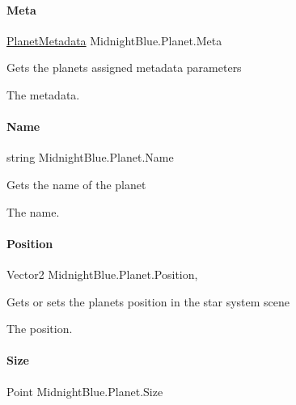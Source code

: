 \paragraph{\texorpdfstring{Meta}{Meta}}
{\footnotesize\ttfamily \hyperlink{class_midnight_blue_1_1_planet_metadata}{Planet\+Metadata} Midnight\+Blue.\+Planet.\+Meta\hspace{0.3cm}{\ttfamily [get]}}



Gets the planets assigned metadata parameters 

The metadata.\hypertarget{class_midnight_blue_1_1_planet_aafbf18faf5aea56097d4f20d6b166d8a}{}\label{class_midnight_blue_1_1_planet_aafbf18faf5aea56097d4f20d6b166d8a} 
\paragraph{\texorpdfstring{Name}{Name}}
{\footnotesize\ttfamily string Midnight\+Blue.\+Planet.\+Name\hspace{0.3cm}{\ttfamily [get]}}



Gets the name of the planet 

The name.\hypertarget{class_midnight_blue_1_1_planet_a1ca1fc407e47136abb5b633e11cb8d51}{}\label{class_midnight_blue_1_1_planet_a1ca1fc407e47136abb5b633e11cb8d51} 
\paragraph{\texorpdfstring{Position}{Position}}
{\footnotesize\ttfamily Vector2 Midnight\+Blue.\+Planet.\+Position\hspace{0.3cm}{\ttfamily [get]}, {\ttfamily [set]}}



Gets or sets the planets position in the star system scene 

The position.\hypertarget{class_midnight_blue_1_1_planet_a10c69ed4de9c28b2e61848e3bb89c377}{}\label{class_midnight_blue_1_1_planet_a10c69ed4de9c28b2e61848e3bb89c377} 
\paragraph{\texorpdfstring{Size}{Size}}
{\footnotesize\ttfamily Point Midnight\+Blue.\+Planet.\+Size\hspace{0.3cm}{\ttfamily [get]}}



